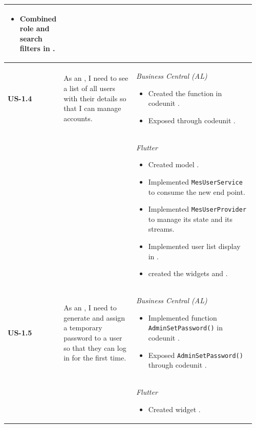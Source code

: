 \begin{longtable}{@{} P{0.09\linewidth} P{0.34\linewidth} P{0.53\linewidth} @{}}
\begin{itemize}[noitemsep, topsep=0pt, partopsep=0pt, leftmargin=*]
		\item Combined role and search filters in .
	\end{itemize} \\
	\midrule
	\textbf{US-1.4}
	& As an , I need to see a list of all 
	users with their details so that I can manage accounts.
	& \noindent\textit{Business Central (AL)}
	\begin{itemize}[noitemsep, topsep=0pt, partopsep=0pt, leftmargin=*]
		\item Created the function  in codeunit .
		\item Exposed  through codeunit .
	\end{itemize}
\\ & &
	\noindent\textit{Flutter}
	\begin{itemize}[noitemsep, topsep=0pt, partopsep=0pt, leftmargin=*]
		\item Created model .
		\item Implemented \texttt{MesUserService} to consume the new end point.
		\item Implemented \texttt{MesUserProvider} to manage its state and its streams.
		\item Implemented user list display in .
		\item created the widgets  and .
	\end{itemize} \\
	\midrule
	\textbf{US-1.5}
	& As an , I need to generate and assign a temporary
	password to a user so that they can log in for the first time.
	& \noindent\textit{Business Central (AL)}
	\begin{itemize}[noitemsep, topsep=0pt, partopsep=0pt, leftmargin=*]
		\item Implemented function \texttt{AdminSetPassword()} in codeunit .
		\item Exposed \texttt{AdminSetPassword()} through codeunit .
	\end{itemize}
\\ & &
	\noindent\textit{Flutter}
	\begin{itemize}[noitemsep, topsep=0pt, partopsep=0pt, leftmargin=*]
		\item Created widget .

\end{itemize}
\end{longtable}

